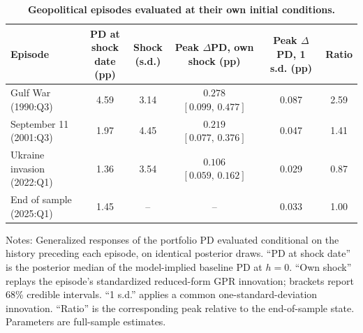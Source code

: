 \begin{table}[!htbp]
\centering
\scriptsize
\caption{\textbf{Geopolitical episodes evaluated at their own initial conditions.}}
\label{tab:state_dependence}
\begin{tabular}{lccccc}
\toprule
Episode & \makecell{PD at shock\\date (pp)} & \makecell{Shock\\(s.d.)} & \makecell{Peak $\Delta$PD,\\own shock (pp)} & \makecell{Peak $\Delta$PD,\\1 s.d. (pp)} & Ratio \\
\midrule
Gulf War (1990:Q3) & 4.59 & 3.14 & \makecell{$0.278$\\{\scriptsize $[0.099,\,0.477]$}} & 0.087 & 2.59 \\
September 11 (2001:Q3) & 1.97 & 4.45 & \makecell{$0.219$\\{\scriptsize $[0.077,\,0.376]$}} & 0.047 & 1.41 \\
Ukraine invasion (2022:Q1) & 1.36 & 3.54 & \makecell{$0.106$\\{\scriptsize $[0.059,\,0.162]$}} & 0.029 & 0.87 \\
End of sample (2025:Q1) & 1.45 & -- & -- & 0.033 & 1.00 \\
\bottomrule
\end{tabular}
\begin{tablenotes}
\footnotesize
\item Notes: Generalized responses of the portfolio PD evaluated conditional on the history preceding each episode, on identical posterior draws. ``PD at shock date'' is the posterior median of the model-implied baseline PD at $h=0$. ``Own shock'' replays the episode's standardized reduced-form GPR innovation; brackets report 68\% credible intervals. ``1 s.d.'' applies a common one-standard-deviation innovation. ``Ratio'' is the corresponding peak relative to the end-of-sample state. Parameters are full-sample estimates.
\end{tablenotes}
\end{table}

